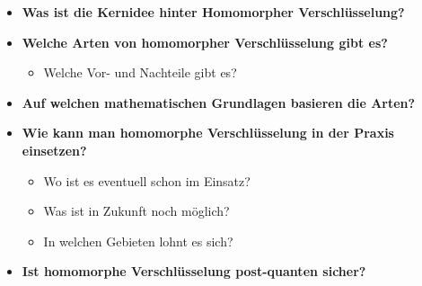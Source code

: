 \label{sec:fragen}
\begin{itemize}
    \item \textbf{Was ist die Kernidee hinter Homomorpher Verschlüsselung?}
    \item \textbf{Welche Arten von homomorpher Verschlüsselung gibt es?}
    \begin{itemize}
        \item Welche Vor- und Nachteile gibt es?
    \end{itemize}
    \item \textbf{Auf welchen mathematischen Grundlagen basieren die Arten?}
    \item \textbf{Wie kann man homomorphe Verschlüsselung in der Praxis einsetzen?}
    \begin{itemize}
        \item Wo ist es eventuell schon im Einsatz?
        \item Was ist in Zukunft noch möglich?
        \item In welchen Gebieten lohnt es sich?
    \end{itemize}
    \item \textbf{Ist homomorphe Verschlüsselung post-quanten sicher?}
\end{itemize}

\vspace{1em}